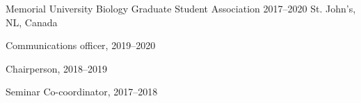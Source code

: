 \begin{cventries}

    
  \cventry
    {Memorial University} %
    {Biology Graduate Student Association} %
    {2017--2020} %
    {St. John's, NL, Canada} %
    {
      \begin{cvitems}
          \item Communications officer, 2019--2020
          \item Chairperson, 2018--2019
          \item Seminar Co-coordinator, 2017--2018
      \end{cvitems}
      }

    


    

\end{cventries}
